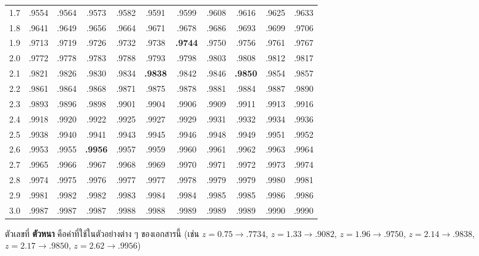 \documentclass[9pt]{extarticle}
\begin{document}
\begin{center}
{\begin{tabular}{r|cccccccccc}
1.7 & .9554 & .9564 & .9573 & .9582 & .9591 & .9599 & .9608 & .9616 & .9625 & .9633\\
1.8 & .9641 & .9649 & .9656 & .9664 & .9671 & .9678 & .9686 & .9693 & .9699 & .9706\\
1.9 & .9713 & .9719 & .9726 & .9732 & .9738 & \textbf{.9744} & .9750 & .9756 & .9761 & .9767\\
2.0 & .9772 & .9778 & .9783 & .9788 & .9793 & .9798 & .9803 & .9808 & .9812 & .9817\\
2.1 & .9821 & .9826 & .9830 & .9834 & \textbf{.9838} & .9842 & .9846 & \textbf{.9850} & .9854 & .9857\\
2.2 & .9861 & .9864 & .9868 & .9871 & .9875 & .9878 & .9881 & .9884 & .9887 & .9890\\
2.3 & .9893 & .9896 & .9898 & .9901 & .9904 & .9906 & .9909 & .9911 & .9913 & .9916\\
2.4 & .9918 & .9920 & .9922 & .9925 & .9927 & .9929 & .9931 & .9932 & .9934 & .9936\\
2.5 & .9938 & .9940 & .9941 & .9943 & .9945 & .9946 & .9948 & .9949 & .9951 & .9952\\
2.6 & .9953 & .9955 & \textbf{.9956} & .9957 & .9959 & .9960 & .9961 & .9962 & .9963 & .9964\\
2.7 & .9965 & .9966 & .9967 & .9968 & .9969 & .9970 & .9971 & .9972 & .9973 & .9974\\
2.8 & .9974 & .9975 & .9976 & .9977 & .9977 & .9978 & .9979 & .9979 & .9980 & .9981\\
2.9 & .9981 & .9982 & .9982 & .9983 & .9984 & .9984 & .9985 & .9985 & .9986 & .9986\\
3.0 & .9987 & .9987 & .9987 & .9988 & .9988 & .9989 & .9989 & .9989 & .9990 & .9990\\
\end{tabular}
\par}
\end{center}
{\small ตัวเลขที่ \textbf{ตัวหนา} คือค่าที่ใช้ในตัวอย่างต่าง ๆ ของเอกสารนี้ (เช่น $z{=}0.75\to.7734$, $z{=}1.33\to.9082$, $z{=}1.96\to.9750$, $z{=}2.14\to.9838$, $z{=}2.17\to.9850$, $z{=}2.62\to.9956$)}
\end{document}

